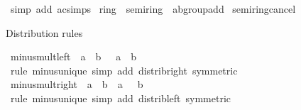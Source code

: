 \begin{isabellebody}
\ {\isacharparenleft}{\kern0pt}simp\ add{\isacharcolon}{\kern0pt}\ ac{\isacharunderscore}{\kern0pt}simps{\isacharparenright}{\kern0pt}%
\endisatagproof
{\isafoldproof}%
%
\isadelimproof
\isanewline
%
\endisadelimproof
\isanewline
{}\isamarkupfalse%
\isanewline
\isanewline
{}\isamarkupfalse%
\ ring\ {\isacharequal}{\kern0pt}\ semiring\ {\isacharplus}{\kern0pt}\ ab{\isacharunderscore}{\kern0pt}group{\isacharunderscore}{\kern0pt}add\isanewline
{}\isanewline
\isanewline
{}\isamarkupfalse%
\ semiring{\isacharunderscore}{\kern0pt}{}{\isacharunderscore}{\kern0pt}cancel%
\isadelimproof
\ %
\endisadelimproof
%
\isatagproof
\isacommand{{\isachardot}{\kern0pt}{\isachardot}{\kern0pt}}\isamarkupfalse%
%
\endisatagproof
{\isafoldproof}%
%
\isadelimproof
%
\endisadelimproof
%
\begin{isamarkuptext}%
Distribution rules%
\end{isamarkuptext}\isamarkuptrue%
\isamarkupfalse%
\ minus{\isacharunderscore}{\kern0pt}mult{\isacharunderscore}{\kern0pt}left{\isacharcolon}{\kern0pt}\ {\isachardoublequoteopen}{\isacharminus}{\kern0pt}\ {\isacharparenleft}{\kern0pt}a\ {\isacharasterisk}{\kern0pt}\ b{\isacharparenright}{\kern0pt}\ {\isacharequal}{\kern0pt}\ {\isacharminus}{\kern0pt}\ a\ {\isacharasterisk}{\kern0pt}\ b{\isachardoublequoteclose}\isanewline
%
\isadelimproof
\ \ %
\endisadelimproof
%
\isatagproof
{}\isamarkupfalse%
\ {\isacharparenleft}{\kern0pt}rule\ minus{\isacharunderscore}{\kern0pt}unique{\isacharparenright}{\kern0pt}\ {\isacharparenleft}{\kern0pt}simp\ add{\isacharcolon}{\kern0pt}\ distrib{\isacharunderscore}{\kern0pt}right\ {\isacharbrackleft}{\kern0pt}symmetric{\isacharbrackright}{\kern0pt}{\isacharparenright}{\kern0pt}%
\endisatagproof
{\isafoldproof}%
%
\isadelimproof
\isanewline
%
\endisadelimproof
\isanewline
{}\isamarkupfalse%
\ minus{\isacharunderscore}{\kern0pt}mult{\isacharunderscore}{\kern0pt}right{\isacharcolon}{\kern0pt}\ {\isachardoublequoteopen}{\isacharminus}{\kern0pt}\ {\isacharparenleft}{\kern0pt}a\ {\isacharasterisk}{\kern0pt}\ b{\isacharparenright}{\kern0pt}\ {\isacharequal}{\kern0pt}\ a\ {\isacharasterisk}{\kern0pt}\ {\isacharminus}{\kern0pt}\ b{\isachardoublequoteclose}\isanewline
%
\isadelimproof
\ \ %
\endisadelimproof
%
\isatagproof
{}\isamarkupfalse%
\ {\isacharparenleft}{\kern0pt}rule\ minus{\isacharunderscore}{\kern0pt}unique{\isacharparenright}{\kern0pt}\ {\isacharparenleft}{\kern0pt}simp\ add{\isacharcolon}{\kern0pt}\ distrib{\isacharunderscore}{\kern0pt}left\ {\isacharbrackleft}{\kern0pt}symmetric{\isacharbrackright}{\kern0pt}{\isacharparenright}{\kern0pt}%

\end{isabellebody}
